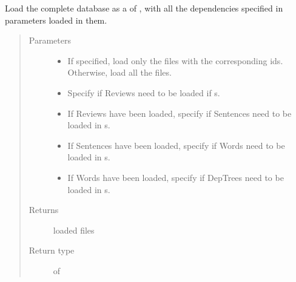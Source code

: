 \documentclass[letterpaper,10pt,english]{sphinxmanual}
\begin{document}
\begin{fulllineitems}
\label{\detokenize{index:loacore.load.file_load.load_database}}
Load the complete database as a  of  , with all the dependencies specified in parameters
loaded in them.
\begin{quote}\begin{description}
\item[{Parameters}] \leavevmode\begin{itemize}
\item {} 
 \textendash{} If specified, load only the files with the corresponding ids. Otherwise, load all the files.

\item {} 
 \textendash{} Specify if Reviews need to be loaded if  s.

\item {} 
 \textendash{} If Reviews have been loaded, specify if Sentences need to be loaded in  s.

\item {} 
 \textendash{} If Sentences have been loaded, specify if Words need to be loaded in  s.

\item {} 
 \textendash{} If Words have been loaded, specify if DepTrees need to be loaded in  s.

\end{itemize}

\item[{Returns}] \leavevmode
loaded files

\item[{Return type}] \leavevmode
{} of 

\end{description}\end{quote}


\end{fulllineitems}
\end{document}
